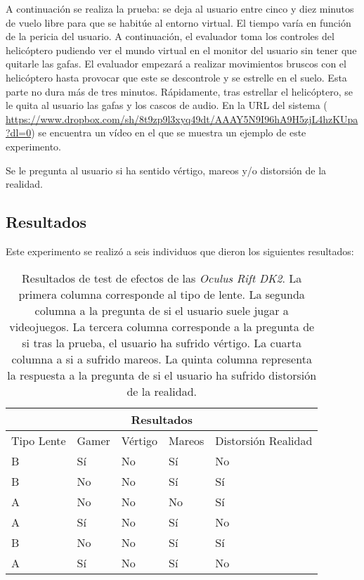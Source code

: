 A continuaci\'on se realiza la prueba: se deja al usuario entre cinco y diez minutos de vuelo libre para que se habit\'ue al entorno virtual. El tiempo var\'ia en funci\'on de la pericia del usuario. A continuaci\'on, el evaluador toma los controles del helic\'optero pudiendo ver el mundo virtual en el monitor del usuario sin tener que quitarle las gafas. El evaluador empezar\'a a realizar movimientos bruscos con el helic\'optero hasta provocar que este se descontrole y se estrelle en el suelo. Esta parte no dura m\'as de tres minutos. R\'apidamente, tras estrellar el helic\'optero, se le quita al usuario las gafas y los cascos de audio. En la URL del sistema ( \url{https://www.dropbox.com/sh/8t9zp9l3xyq49dt/AAAY5N9I96hA9H5zjL4hzKUpa?dl=0}) se encuentra un v\'ideo en el que se muestra un ejemplo de este experimento. 

Se le pregunta al usuario si ha sentido v\'ertigo, mareos y/o distorsi\'on de la realidad.

\subsection{Resultados}
Este experimento se realiz\'o a seis individuos que dieron los siguientes resultados:

\begin{table}[htb]
	\centering
    \scriptsize
	\begin{tabular}{|l|l|l|l|l|}
		\hline
		\multicolumn{5}{|c|}{Resultados} \\ \hline
		Tipo Lente & Gamer & V\'ertigo & Mareos & Distorsi\'on Realidad\\
		\hline
		B & S\'i & No & S\'i & No\\ \hline
		B & No & No & S\'i & S\'i\\ \hline
		A & No & No & No & S\'i\\ \hline
		A & S\'i & No & S\'i & No\\ \hline
		B & No & No & S\'i & S\'i\\ \hline
		A & S\'i & No & S\'i & No\\ \hline
	\end{tabular}
	\caption{Resultados de test de efectos de las \emph{Oculus Rift DK2}. La primera columna corresponde al tipo de lente. La segunda columna a la pregunta de si el usuario suele jugar a videojuegos. La tercera columna corresponde a la pregunta de si tras la prueba, el usuario ha sufrido v\'ertigo. La cuarta columna a si a sufrido mareos. La quinta columna representa la respuesta a la pregunta de si el usuario ha sufrido distorsi\'on de la realidad.}
	\label{tabla:test1}
\end{table}

